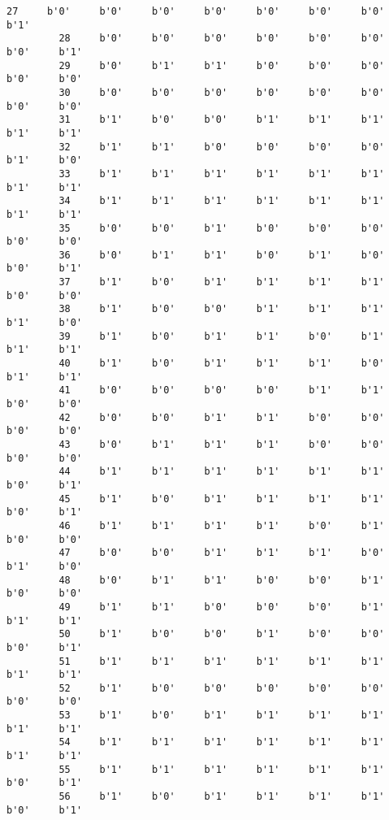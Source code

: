 \documentclass[11pt]{article}
\begin{document}
\begin{Verbatim}[commandchars=\\\{\}]
         27     b'0'     b'0'     b'0'     b'0'     b'0'     b'0'     b'0'     b'1'   
         28     b'0'     b'0'     b'0'     b'0'     b'0'     b'0'     b'0'     b'1'   
         29     b'0'     b'1'     b'1'     b'0'     b'0'     b'0'     b'0'     b'0'   
         30     b'0'     b'0'     b'0'     b'0'     b'0'     b'0'     b'0'     b'0'   
         31     b'1'     b'0'     b'0'     b'1'     b'1'     b'1'     b'1'     b'1'   
         32     b'1'     b'1'     b'0'     b'0'     b'0'     b'0'     b'1'     b'0'   
         33     b'1'     b'1'     b'1'     b'1'     b'1'     b'1'     b'1'     b'1'   
         34     b'1'     b'1'     b'1'     b'1'     b'1'     b'1'     b'1'     b'1'   
         35     b'0'     b'0'     b'1'     b'0'     b'0'     b'0'     b'0'     b'0'   
         36     b'0'     b'1'     b'1'     b'0'     b'1'     b'0'     b'0'     b'1'   
         37     b'1'     b'0'     b'1'     b'1'     b'1'     b'1'     b'0'     b'0'   
         38     b'1'     b'0'     b'0'     b'1'     b'1'     b'1'     b'1'     b'0'   
         39     b'1'     b'0'     b'1'     b'1'     b'0'     b'1'     b'1'     b'1'   
         40     b'1'     b'0'     b'1'     b'1'     b'1'     b'0'     b'1'     b'1'   
         41     b'0'     b'0'     b'0'     b'0'     b'1'     b'1'     b'0'     b'0'   
         42     b'0'     b'0'     b'1'     b'1'     b'0'     b'0'     b'0'     b'0'   
         43     b'0'     b'1'     b'1'     b'1'     b'0'     b'0'     b'0'     b'0'   
         44     b'1'     b'1'     b'1'     b'1'     b'1'     b'1'     b'0'     b'1'   
         45     b'1'     b'0'     b'1'     b'1'     b'1'     b'1'     b'0'     b'1'   
         46     b'1'     b'1'     b'1'     b'1'     b'0'     b'1'     b'0'     b'0'   
         47     b'0'     b'0'     b'1'     b'1'     b'1'     b'0'     b'1'     b'0'   
         48     b'0'     b'1'     b'1'     b'0'     b'0'     b'1'     b'0'     b'0'   
         49     b'1'     b'1'     b'0'     b'0'     b'0'     b'1'     b'1'     b'1'   
         50     b'1'     b'0'     b'0'     b'1'     b'0'     b'0'     b'0'     b'1'   
         51     b'1'     b'1'     b'1'     b'1'     b'1'     b'1'     b'1'     b'1'   
         52     b'1'     b'0'     b'0'     b'0'     b'0'     b'0'     b'0'     b'0'   
         53     b'1'     b'0'     b'1'     b'1'     b'1'     b'1'     b'1'     b'1'   
         54     b'1'     b'1'     b'1'     b'1'     b'1'     b'1'     b'1'     b'1'   
         55     b'1'     b'1'     b'1'     b'1'     b'1'     b'1'     b'0'     b'1'   
         56     b'1'     b'0'     b'1'     b'1'     b'1'     b'1'     b'0'     b'1'   

\end{Verbatim}
\end{document}
